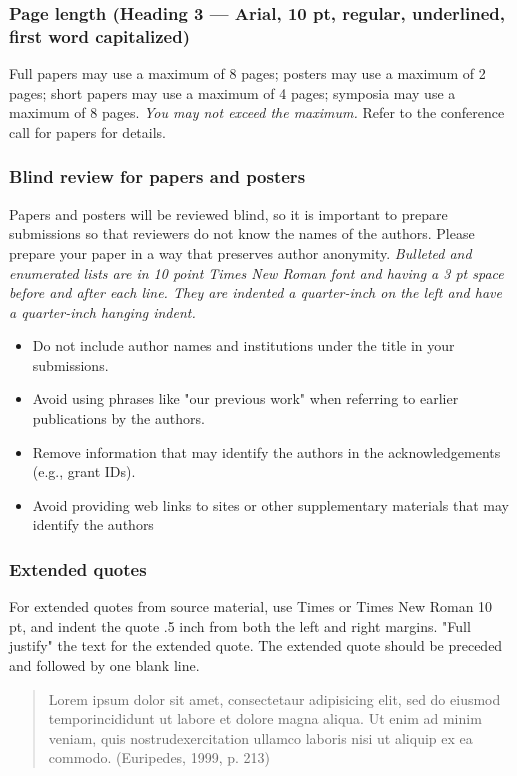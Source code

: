 \documentclass{article}
\begin{document}
\subsubsection{Page length (Heading 3 --- Arial, 10 pt, regular, underlined, first word capitalized)}
{\color{red} Full papers may use a maximum of 8 pages; posters may use a maximum of 2 pages; short papers may use a maximum of 4 pages; symposia may use a maximum of 8 pages.} \emph{You may not exceed the maximum.} Refer to the
conference call for papers for details.

\subsubsection{Blind review for papers and posters}
Papers and posters will be reviewed blind, so it is important to prepare submissions so that reviewers do not
know the names of the authors. Please prepare your paper in a way that preserves author anonymity. 
{\color{red} \emph{Bulleted and enumerated lists are in 10 point Times New Roman font and having a 3 pt space before and after each line.
They are indented a quarter-inch on the left and have a quarter-inch hanging indent. }}
\begin{itemize}
\item Do not include author names and institutions under the title in your submissions.
\item Avoid using phrases like "our previous work" when referring to earlier publications by the authors.
\item Remove information that may identify the authors in the acknowledgements (e.g., grant IDs).
\item Avoid providing web links to sites or other supplementary materials that may identify the authors
\end{itemize}

\subsubsection{Extended quotes}
For extended quotes from source material, use Times or Times New Roman 10 pt, and indent the quote .5 inch
from both the left and right margins. "Full justify" the text for the extended quote. The extended quote should be
preceded and followed by one blank line.

\begin{quotation}
Lorem ipsum dolor sit amet, consectetaur adipisicing elit, sed do eiusmod
temporincididunt ut labore et dolore magna aliqua. Ut enim ad minim veniam, quis
nostrudexercitation ullamco laboris nisi ut aliquip ex ea commodo. (Euripedes, 1999, p. 213)
\end{quotation}
\end{document}
